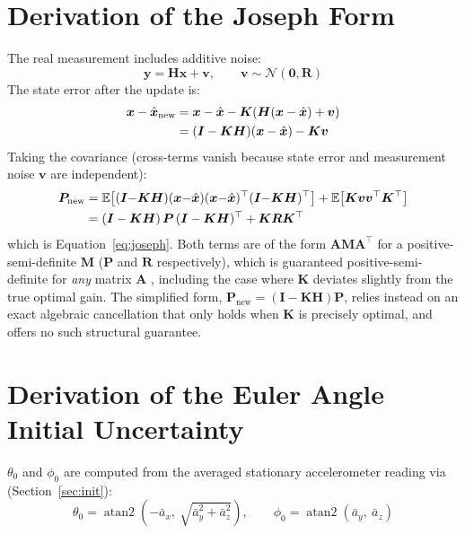\documentclass[12pt,a4paper]{article}
\newcommand{\bx}{\bm{x}}
\newcommand{\bP}{\bm{P}}
\newcommand{\bI}{\bm{I}}
\newcommand{\E}{\mathbb{E}}
\begin{document}
{\section{Derivation of the Joseph Form}
\label{app:joseph}

The real measurement includes additive noise:
\begin{equation}
  \bm{y} = \bm{H}\bx + \bm{v}, \qquad \bm{v} \sim \mathcal{N}(\bm{0}, \bm{R})
\end{equation}
The state error after the update is:
\begin{align}
  \bx - \hat{\bx}_{\text{new}}
  &= \bx - \hat{\bx} - \bm{K}(\bm{H}(\bx-\hat{\bx}) + \bm{v}) \notag\\
  &= (\bI - \bm{K}\bm{H})(\bx - \hat{\bx}) - \bm{K}\bm{v}
\end{align}
Taking the covariance (cross-terms vanish because state error and
measurement noise $\bm{v}$ are independent):
\begin{align}
  \bP_{\text{new}}
  &= \E\!\left[(\bI{-}\bm{K}\bm{H})(\bx{-}\hat{\bx})(\bx{-}\hat{\bx})^{\top}
    (\bI{-}\bm{K}\bm{H})^{\top}\right]
    + \E\!\left[\bm{K}\bm{v}\bm{v}^{\top}\bm{K}^{\top}\right] \notag\\
  &= (\bI-\bm{K}\bm{H})\,\bP\,(\bI-\bm{K}\bm{H})^{\top}
    + \bm{K}\bm{R}\bm{K}^{\top}
\end{align}
which is Equation~\eqref{eq:joseph}. Both terms are of the form
$\bm{A}\bm{M}\bm{A}^\top$ for a positive-semi-definite $\bm{M}$
($\bP$ and $\bm{R}$ respectively), which is guaranteed
positive-semi-definite for \emph{any} matrix $\bm{A}$
\cite{grewal2015kalman}, including the case where $\bm{K}$ deviates
slightly from the true optimal gain. The simplified form,
$\bP_{\text{new}} = (\bI-\bm{K}\bm{H})\bP$, relies instead on an exact
algebraic cancellation that only holds when $\bm{K}$ is precisely
optimal, and offers no such structural guarantee.


\section{Derivation of the Euler Angle Initial Uncertainty}
\label{app:P0-angle-derivation}

$\theta_0$ and $\phi_0$ are computed from the averaged stationary
accelerometer reading via (Section~\ref{sec:init}):
\begin{equation}
  \theta_0 = \operatorname{atan2}\!\left(-\bar{a}_x,\ \sqrt{\bar{a}_y^2+\bar{a}_z^2}\right),
  \qquad
  \phi_0 = \operatorname{atan2}(\bar{a}_y,\ \bar{a}_z)
\end{equation}

}
\end{document}
